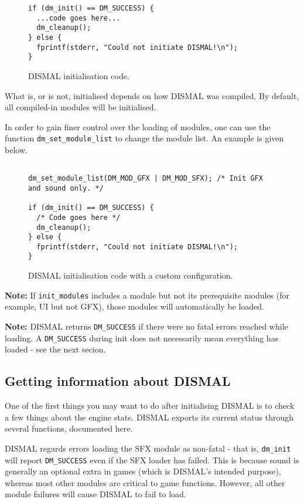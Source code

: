 \documentclass[a4paper]{scrbook}
\begin{document}
\begin{figure}[h]
  \begin{verbatim}
if (dm_init() == DM_SUCCESS) {
  ...code goes here...
  dm_cleanup();
} else {
  fprintf(stderr, "Could not initiate DISMAL!\n");
}
  \end{verbatim}

\caption{DISMAL initialisation code.}

\end{figure}

What is, or is not, initialised depends on how DISMAL was compiled. By
default, all compiled-in modules will be initialised.

In order to gain finer control over the loading of modules, one can
use the function \verb:dm_set_module_list: to change the module
list. An example is given below.

\begin{figure}[h]
  \begin{verbatim}

dm_set_module_list(DM_MOD_GFX | DM_MOD_SFX); /* Init GFX and sound only. */

if (dm_init() == DM_SUCCESS) {
  /* Code goes here */
  dm_cleanup();
} else {
  fprintf(stderr, "Could not initiate DISMAL!\n");
}
  \end{verbatim}

\caption{DISMAL initialisation code with a custom configuration.}

\end{figure}

\textbf{Note:} If \verb:init_modules: includes a module but not its
prerequisite modules (for example, UI but not GFX), those modules will
automatically be loaded.

\textbf{Note:} DISMAL returns \verb:DM_SUCCESS: if there were no fatal
errors reached while loading. A \verb:DM_SUCCESS: during init does not
necessarily mean everything has loaded - see the next secion.

\subsection{Getting information about DISMAL}

One of the first things you may want to do after initialising DISMAL
is to check a few things about the engine state. DISMAL exports its
current status through several functions, documented here.

DISMAL regards errors loading the SFX module as non-fatal - that is,
\verb:dm_init: will report \verb:DM_SUCCESS: even if the SFX loader
has failed. This is because sound is generally an optional extra in
games (which is DISMAL's intended purpose), whereas most other modules
are critical to game functions. However, all other module failures
will cause DISMAL to fail to load.
\end{document}
